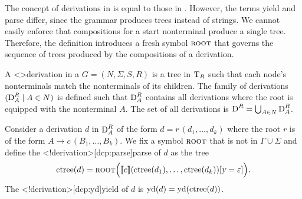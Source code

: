 \documentclass[../document.tex]{subfiles}
\begin{document}
    The concept of derivations in  is equal to those in .
    However, the terms yield and parse differ, since the grammar produces trees instead of strings.
    We cannot easily enforce that compositions for a start nonterminal produce a single tree.
    Therefore, the definition introduces a fresh symbol \(\textsc{root}\) that governs the sequence of trees produced by the compositions of a derivation.

    \begin{definition}
        A <\dcp>{derivation} in a  \(G = (N, \varSigma, S, R)\) is a tree in \(\operatorname{T}_R\) such that each node's  nonterminals match the  nonterminals of its children.
        The family of derivations \((\operatorname{D}^R_A \mid A \in N)\) is defined such that \(\operatorname{D}^R_A\) contains all derivations where the root is equipped with the  nonterminal \(A\).
        The set of all derivations is \(\operatorname{D}^R = \bigcup_{A \in N} \operatorname{D}^R_A\).

        Consider a derivation \(d\) in \(\operatorname{D}^R_A\) of the form \(d = r\,(d_1, \ldots, d_k)\) where the root \(r\) is of the form \(A \to c\,(B_1, \ldots, B_k)\).
        We fix a symbol \(\textsc{root}\) that is not in \(\varGamma \cup \varSigma\) and define the <\dcp!derivation>[dcp:parse]{parse} of \(d\) as the tree \[
            \operatorname{ctree}(d) = \textsc{root}\Big( \llbracket c\rrbracket(\operatorname{ctree}(d_1),\ldots,\operatorname{ctree}(d_k))[\textsl{y}=\varepsilon]\Big) \text{.}
        \]
        The <\dcp!derivation>[dcp:yd]{yield} of \(d\) is \(\operatorname{yd}(d) = \operatorname{yd}(\operatorname{ctree}(d))\).
    \end{definition}
\end{document}
